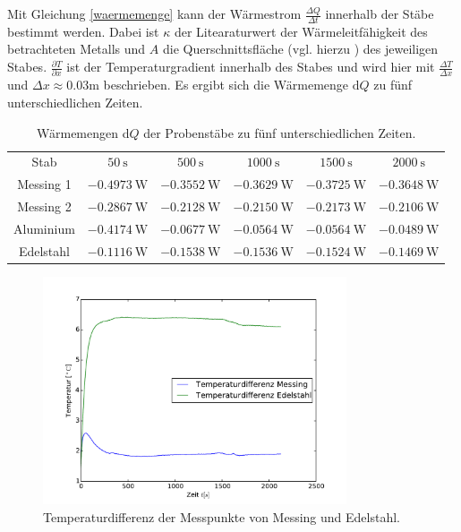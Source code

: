 \noindent Mit Gleichung \eqref{waermemenge} kann der Wärmestrom $\frac{\Delta{Q}}{\Delta{t}}$ innerhalb der Stäbe bestimmt werden. 
Dabei ist $\kappa$ der Litearaturwert der Wärmeleitfähigkeit des betrachteten Metalls und $A$ die Querschnittsfläche (vgl. hierzu \cite{V204}) des jeweiligen Stabes.
$\frac{\partial T}{\partial x}$ ist der Temperaturgradient innerhalb des Stabes und wird hier mit $\frac{\Delta T}{\Delta x}$ und $\Delta x \approx 0.03\si{\meter}$ beschrieben.
Es ergibt sich die Wärmemenge $\mathup{d}Q$ zu fünf unterschiedlichen Zeiten.
\begin{table}
	\centering
	\begin{tabular}{cccccc}
	\sisetup{table-format=1.4}\\
\toprule
	Stab & $50\:\si\second$ & $500\:\si\second$ & $1000\:\si\second$ & $1500\:\si\second$ & $2000\:\si\second$ \\
	\midrule
	Messing 1 &$-0.4973\:\si{\watt}$ &$-0.3552\:\si{\watt}$&$-0.3629\:\si{\watt}$&$-0.3725\:\si{\watt}$&$-0.3648\:\si{\watt}$\\
	Messing 2 &$-0.2867\:\si{\watt}$& $-0.2128\:\si{\watt}$&$-0.2150\:\si{\watt}$&$-0.2173\:\si{\watt}$&$-0.2106\:\si{\watt}$\\
	Aluminium &$-0.4174\:\si{\watt}$&$-0.0677\:\si{\watt}$&$-0.0564\:\si{\watt}$&$-0.0564\:\si{\watt}$&$-0.0489\:\si{\watt}$\\
	Edelstahl &$-0.1116\:\si{\watt}$&$-0.1538\:\si{\watt}$&$-0.1536\:\si{\watt}$&$-0.1524\:\si{\watt}$&$-0.1469\:\si{\watt}$\\
	\bottomrule
	\end{tabular}
	\caption{Wärmemengen d$Q$ der Probenstäbe zu fünf unterschiedlichen Zeiten.}
	\label{tab:waememengen}
\end{table}
\begin{figure}
	\centering
	\includegraphics[width=0.8\textwidth]{Bilder/M1_Tempdiff.pdf}
	\caption{Temperaturdifferenz der Messpunkte von Messing und Edelstahl.}
	\label{fig:tempverl}
\end{figure}
